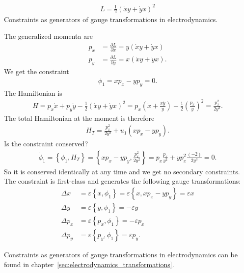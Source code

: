 \begin{exercise}
\begin{align*}
L = \frac{1}{2} (\dot{x}y + \dot{y}x)^2
\end{align*}
Constraints as generators of gauge transformations in electrodynamics. 
\end{exercise}
\begin{solution}
The generalized momenta are
\begin{align*}
p_x &= \frac{\partial L}{\partial \dot{x}} = y (\dot{x}y + \dot{y}x) \\
p_y &= \frac{\partial L}{\partial \dot{y}} = x (\dot{x}y + \dot{y}x).
\end{align*}
We get the constraint 
\begin{align*}
\phi_1 = x p_x - y p_y = 0.
\end{align*}
The Hamiltonian is
\begin{align*}
H = p_x \dot{x} + p_y \dot{y} - \frac{1}{2} (\dot{x}y + \dot{y}x)^2 = p_x \left(\dot{x} + \frac{x \dot{y}}{y}\right) - \frac{1}{2} \left(\frac{p_x}{y}\right)^2 = \frac{p_x^2}{2 y^2}.
\end{align*}
The total Hamiltonian at the moment is therefore
\begin{align*}
H_T = \frac{p_x^2}{2 y^2} + u_1 (x p_x - y p_y).
\end{align*}
Is the constraint conserved?
\begin{align*}
\dot{\phi}_1 = \left \{ \phi_1,H_T \right \} = \left \{ x p_x - y p_y,\frac{p_x^2}{2 y^2} \right \} = p_x \frac{p_x}{y^2} + y p_x^2 \frac{(-2)}{2 y^3} = 0.
\end{align*}
So it is conserved identically at any time and we get no secondary constraints. The constraint is first-class and generates the following gauge transformations:
\begin{align*}
\Delta x &= \varepsilon \left \{ x,\phi_1 \right \} = \varepsilon \left \{ x,x p_x - y p_y \right \} = \varepsilon x \\
\Delta y &= \varepsilon \left \{ y,\phi_1 \right \} = - \varepsilon y \\
\Delta p_x &= \varepsilon \left \{ p_x,\phi_1 \right \} = - \varepsilon p_x \\
\Delta p_y &= \varepsilon \left \{ p_y,\phi_1 \right \} = \varepsilon p_y.
\end{align*}

Constraints as generators of gauge transformations in electrodynamics can be found in chapter~\vref{sec:electrodynamics_transformations}.
\end{solution}



